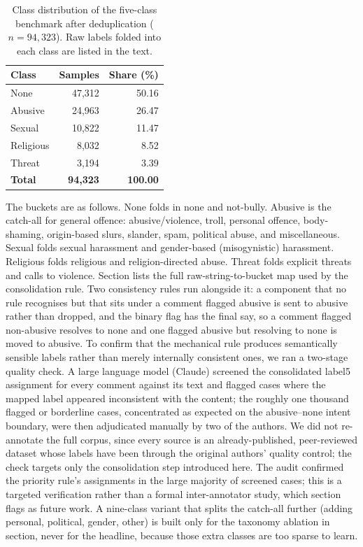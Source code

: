 \documentclass[11pt,a4paper]{article}
\def\Cref#1{Section}%
\def\cref#1{section}%
\def\texttt#1{#1}%
\def\emph#1{#1}%
\begin{document}
\begin{table}[!htbp]
\centering
\caption{Class distribution of the five-class benchmark after deduplication ($n = 94{,}323$). Raw labels folded into each class are listed in the text.}
\label{tab:classes}
\small
\begin{tabular}{@{}lrr@{}}
\toprule
\textbf{Class} & \textbf{Samples} & \textbf{Share (\%)} \\
\midrule
None & 47{,}312 & 50.16 \\
Abusive & 24{,}963 & 26.47 \\
Sexual & 10{,}822 & 11.47 \\
Religious & 8{,}032 & 8.52 \\
Threat & 3{,}194 & 3.39 \\
\midrule
\textbf{Total} & \textbf{94{,}323} & \textbf{100.00} \\
\bottomrule
\end{tabular}
\end{table}

The buckets are as follows. \emph{None} folds in \texttt{none} and \texttt{not-bully}. \emph{Abusive} is the catch-all for general offence: abusive/violence, troll, personal offence, body-shaming, origin-based slurs, slander, spam, political abuse, and miscellaneous. \emph{Sexual} folds sexual harassment and gender-based (misogynistic) harassment. \emph{Religious} folds religious and religion-directed abuse. \emph{Threat} folds explicit threats and calls to violence. \Cref{tab:consolidation} lists the full raw-string-to-bucket map used by the consolidation rule. Two consistency rules run alongside it: a component that no rule recognises but that sits under a comment flagged abusive is sent to \emph{abusive} rather than dropped, and the binary flag has the final say, so a comment flagged non-abusive resolves to \emph{none} and one flagged abusive but resolving to \emph{none} is moved to \emph{abusive}. To confirm that the mechanical rule produces semantically sensible labels rather than merely internally consistent ones, we ran a two-stage quality check. A large language model (Claude) screened the consolidated \texttt{label5} assignment for every comment against its text and flagged cases where the mapped label appeared inconsistent with the content; the roughly one thousand flagged or borderline cases, concentrated as expected on the \emph{abusive}--\emph{none} intent boundary, were then adjudicated manually by two of the authors. We did not re-annotate the full corpus, since every source is an already-published, peer-reviewed dataset whose labels have been through the original authors' quality control; the check targets only the consolidation step introduced here. The audit confirmed the priority rule's assignments in the large majority of screened cases; this is a targeted verification rather than a formal inter-annotator study, which \cref{sec:limitations} flags as future work. A nine-class variant that splits the catch-all further (adding \texttt{personal, political, gender, other}) is built only for the taxonomy ablation in \cref{sec:ablation-results}, never for the headline, because those extra classes are too sparse to learn.
\end{document}
